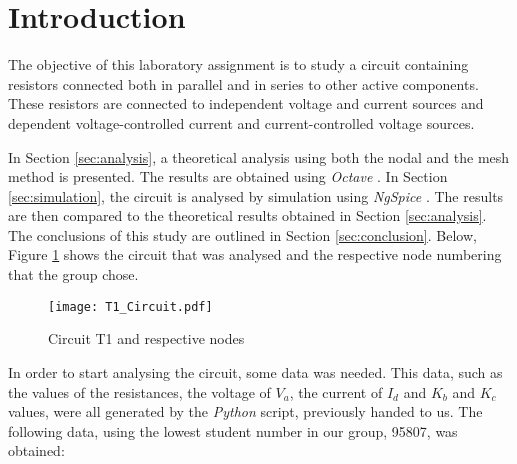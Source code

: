 \section{Introduction}
\label{sec:introduction}

The objective of this laboratory assignment is to study a circuit containing resistors connected both in parallel and in series to other active components. These resistors are connected to independent voltage and current sources and dependent voltage-controlled current and current-controlled voltage sources.


In Section \ref{sec:analysis}, a theoretical analysis using both the nodal and the mesh method is presented. The results are obtained using \emph{Octave} \cite{bib:octave}. In Section \ref{sec:simulation}, the circuit is analysed by simulation using \emph{NgSpice} \cite{bib:ngspice}. The results are then compared to the theoretical results obtained in Section \ref{sec:analysis}. The conclusions of this study are outlined in Section \ref{sec:conclusion}. Below, Figure \ref{fig:t1circuit} shows the circuit that was analysed and the respective node numbering that the group chose.

\begin{figure}[!htp] \centering
\texttt{[image: T1\_Circuit.pdf]}
\caption{Circuit T1 and respective nodes}
\label{fig:t1circuit}
\end{figure}
\FloatBarrier

In order to start analysing the circuit, some data was needed. This data, such as the values of the resistances, the voltage of $V_a$, the current of $I_d$ and $K_b$ and $K_c$ values, were all generated by the \emph{Python} script, previously handed to us. The following data, using the lowest student number in our group, 95807, was obtained:

